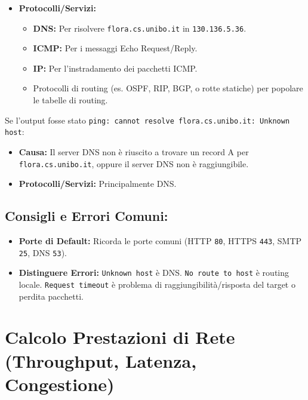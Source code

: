 \begin{itemize}
\begin{itemize}
    \end{itemize}
    \item \textbf{Protocolli/Servizi:}
    \begin{itemize}
        \item \textbf{DNS:} Per risolvere \texttt{flora.cs.unibo.it} in \texttt{130.136.5.36}.
        \item \textbf{ICMP:} Per i messaggi Echo Request/Reply.
        \item \textbf{IP:} Per l'instradamento dei pacchetti ICMP.
        \item Protocolli di routing (es. OSPF, RIP, BGP, o rotte statiche) per popolare le tabelle di routing.
    \end{itemize}
\end{itemize}
Se l'output fosse stato \texttt{ping: cannot resolve flora.cs.unibo.it: Unknown host}:
\begin{itemize}
    \item \textbf{Causa:} Il server DNS non è riuscito a trovare un record A per \texttt{flora.cs.unibo.it}, oppure il server DNS non è raggiungibile.
    \item \textbf{Protocolli/Servizi:} Principalmente DNS.
\end{itemize}

\subsection{Consigli e Errori Comuni:}
\begin{itemize}
    \item \textbf{Porte di Default:} Ricorda le porte comuni (HTTP \texttt{80}, HTTPS \texttt{443}, SMTP \texttt{25}, DNS \texttt{53}).
    \item \textbf{Distinguere Errori:} \texttt{Unknown host} è DNS. \texttt{No route to host} è routing locale. \texttt{Request timeout} è problema di raggiungibilità/risposta del target o perdita pacchetti.
\end{itemize}

\section{Calcolo Prestazioni di Rete (Throughput, Latenza, Congestione)}

